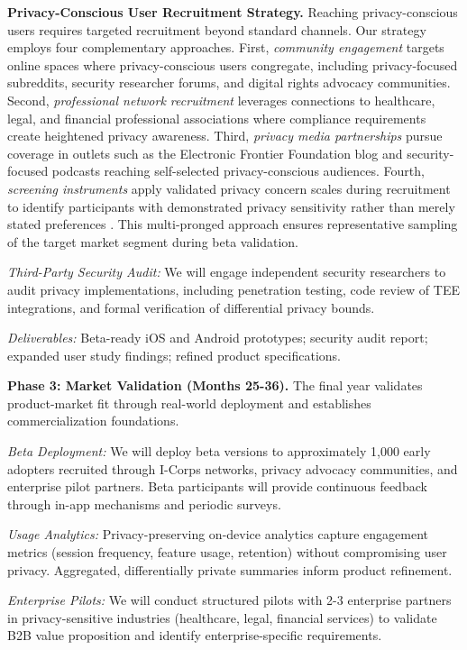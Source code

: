 \documentclass[11pt]{article}
\begin{document}
\textbf{Privacy-Conscious User Recruitment Strategy.} Reaching privacy-conscious 
users requires targeted recruitment beyond standard channels. Our strategy 
employs four complementary approaches. First, \textit{community engagement} 
targets online spaces where privacy-conscious users congregate, including 
privacy-focused subreddits, security researcher forums, and digital rights 
advocacy communities. Second, \textit{professional network recruitment} 
leverages connections to healthcare, legal, and financial professional 
associations where compliance requirements create heightened privacy awareness. 
Third, \textit{privacy media partnerships} pursue coverage in outlets such as 
the Electronic Frontier Foundation blog and security-focused podcasts reaching 
self-selected privacy-conscious audiences. Fourth, \textit{screening instruments} 
apply validated privacy concern scales during recruitment to identify 
participants with demonstrated privacy sensitivity rather than merely stated 
preferences \cite{buchanan2007development}. This multi-pronged approach ensures 
representative sampling of the target market segment during beta validation.

\textit{Third-Party Security Audit:} We will engage independent security researchers to audit privacy implementations, including penetration testing, code review of TEE integrations, and formal verification of differential privacy bounds.

\textit{Deliverables:} Beta-ready iOS and Android prototypes; security audit report; expanded user study findings; refined product specifications.

\textbf{Phase 3: Market Validation (Months 25-36).}
The final year validates product-market fit through real-world deployment and establishes commercialization foundations.

\textit{Beta Deployment:} We will deploy beta versions to approximately 1,000 early adopters recruited through I-Corps networks, privacy advocacy communities, and enterprise pilot partners. Beta participants will provide continuous feedback through in-app mechanisms and periodic surveys.

\textit{Usage Analytics:} Privacy-preserving on-device analytics capture engagement metrics (session frequency, feature usage, retention) without compromising user privacy. Aggregated, differentially private summaries inform product refinement.

\textit{Enterprise Pilots:} We will conduct structured pilots with 2-3 enterprise partners in privacy-sensitive industries (healthcare, legal, financial services) to validate B2B value proposition and identify enterprise-specific requirements.
\end{document}
